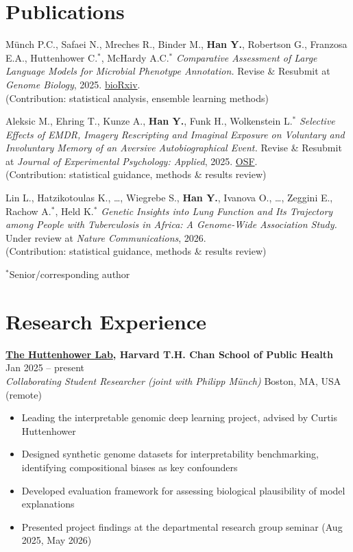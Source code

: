 \documentclass[a4paper,11pt]{article}
\newcommand{\entry}[4]{%
  \textbf{#1} \hfill #2\\
  \textit{#3} \hfill #4\par
}
\begin{document}
\section*{Publications}

Münch P.C., Safaei N., Mreches R., Binder M., \textbf{Han Y.}, Robertson G., Franzosa E.A., Huttenhower C.$^*$, McHardy A.C.$^*$
\emph{Comparative Assessment of Large Language Models for Microbial Phenotype Annotation.}
Revise \& Resubmit at \textit{Genome Biology}, 2025. \href{https://doi.org/10.1101/2025.11.24.690272}{bioRxiv}.\\
{\small (Contribution: statistical analysis, ensemble learning methods)}

\vspace{0.4em}

Aleksic M., Ehring T., Kunze A., \textbf{Han Y.}, Funk H., Wolkenstein L.$^*$
\emph{Selective Effects of EMDR, Imagery Rescripting and Imaginal Exposure on Voluntary and Involuntary Memory of an Aversive Autobiographical Event.}
Revise \& Resubmit at \textit{Journal of Experimental Psychology: Applied}, 2025. \href{https://doi.org/10.31219/osf.io/9hmdb_v2}{OSF}.\\
{\small (Contribution: statistical guidance, methods \& results review)}

\vspace{0.4em}

Lin L., Hatzikotoulas K., \ldots, Wiegrebe S., \textbf{Han Y.}, Ivanova O., \ldots, Zeggini E., Rachow A.$^*$, Held K.$^*$
\emph{Genetic Insights into Lung Function and Its Trajectory among People with Tuberculosis in Africa: A Genome-Wide Association Study.} Under review at \textit{Nature Communications}, 2026.\\
{\small (Contribution: statistical guidance, methods \& results review)}

\vspace{0.2em}
{\footnotesize $^*$Senior/corresponding author}


\section*{Research Experience}

\entry{\href{https://huttenhower.sph.harvard.edu/people/}{The Huttenhower Lab}, Harvard T.H. Chan School of Public Health}{Jan 2025 -- present}
      {Collaborating Student Researcher (joint with Philipp Münch)}{Boston, MA, USA (remote)}
\begin{itemize}[leftmargin=1.5em, itemsep=0pt, parsep=0.1em, topsep=0.1em]
\item Leading the interpretable genomic deep learning project, advised by Curtis Huttenhower
\item Designed synthetic genome datasets for interpretability benchmarking, identifying compositional biases as key confounders
\item Developed evaluation framework for assessing biological plausibility of model explanations
\item Presented project findings at the departmental research group seminar (Aug 2025, May 2026)
\end{itemize}
\end{document}
